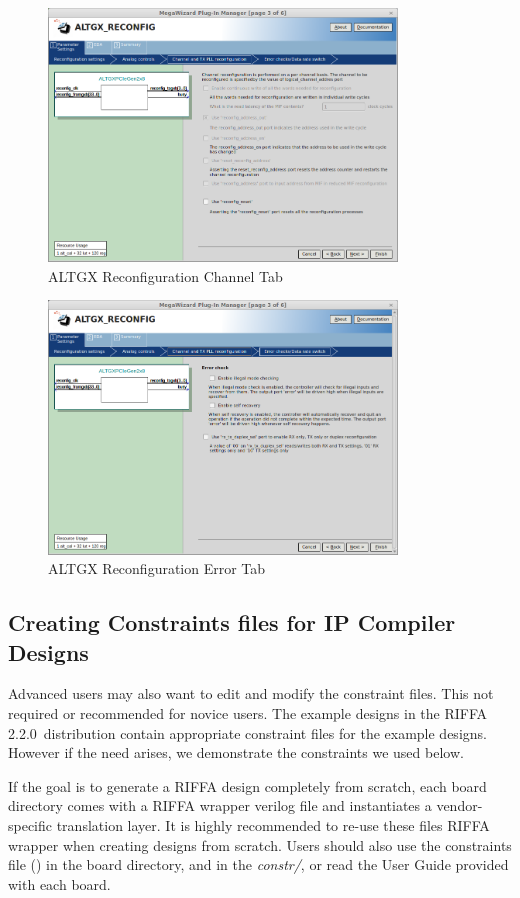 \documentclass{refrep}
\newcommand{\RIFFAVer}{2.2.0}
\newcommand{\Directory}[1]{\textit{#1}}
\newcommand{\Altera}[1]{{\color{blue}{#1}}}
\begin{document}
\begin{figure}[H]
  \includegraphics[width=350px,center]{ALTGXReconfigTabChannel.png}
  \caption{ALTGX Reconfiguration Channel Tab}
  \label{Fig:Altera:ALTGX:TabChannel}
\end{figure}

\begin{figure}[H]
  \includegraphics[width=350px,center]{ALTGXReconfigTabError.png}
  \caption{ALTGX Reconfiguration Error Tab}
  \label{Fig:Altera:ALTGX:TabError}
\end{figure}

\pagebreak
\subsection{Creating Constraints files for IP Compiler Designs}
Advanced users may also want to edit and modify the constraint files. This not
required or recommended for novice users. The example designs in the RIFFA
\RIFFAVer~distribution contain appropriate constraint files for the example
designs. However if the need arises, we demonstrate the constraints we used
below.

If the goal is to generate a RIFFA design completely from scratch, each board
directory comes with a RIFFA wrapper verilog file and instantiates a
vendor-specific translation layer. It is highly recommended to re-use these
files RIFFA wrapper when creating designs from scratch. Users should also use
the constraints file (\Altera{.sdc}) in the board directory, and in the
\Directory{constr/}, or read the User Guide provided with each board.
\end{document}
